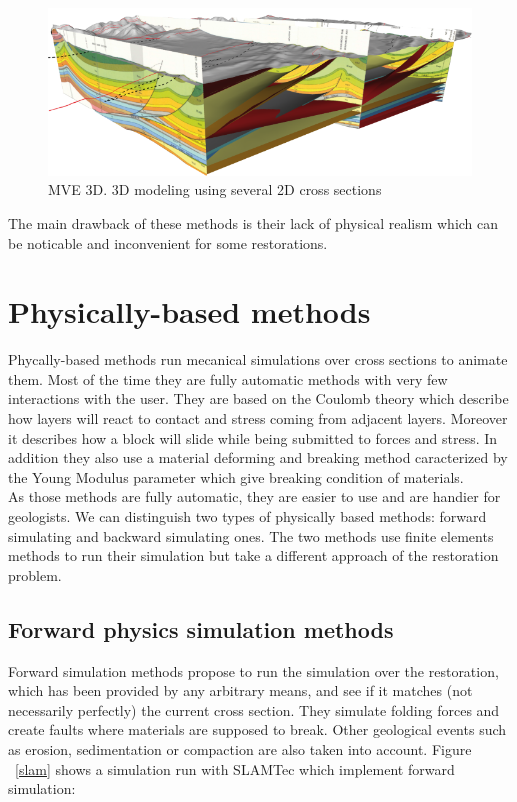 \documentclass[12pt, a4paper]{report} %
\begin{document}
\begin{figure}[H]
	\centering
	\includegraphics[scale=1]{mve3D.png}
	\caption{MVE 3D. 3D modeling using several 2D cross sections}
	\label{mve3}
\end{figure}
The main drawback of these methods is their lack of physical realism which can be noticable and inconvenient for some restorations.
\section{Physically-based methods}
Phycally-based methods run mecanical simulations over cross sections to animate them. Most of the time they are fully automatic methods with very few interactions with the user. They are based on the Coulomb theory which describe how layers will react to contact and stress coming from  adjacent layers. Moreover it describes how a block will slide while being submitted to forces and stress. In addition they also use a material deforming and breaking method caracterized by the Young Modulus parameter which give breaking condition of materials. \\
As those methods are fully automatic, they are easier to use and are handier for geologists.
We can distinguish two types of physically based methods: forward simulating and backward simulating ones.
The two methods use finite elements methods to run their simulation but take a different approach of the restoration problem.
\subsection{Forward physics simulation methods}
Forward simulation methods propose to run the simulation over the restoration, which has been provided by any arbitrary means, and see if it matches (not necessarily perfectly) the current cross section. They simulate folding forces and create faults where materials are supposed to break. Other geological events such as erosion, sedimentation or compaction are also taken into account. Figure ~\ref{slam} shows a simulation run with SLAMTec \cite{SLAMTec} which implement forward simulation:
\end{document}
